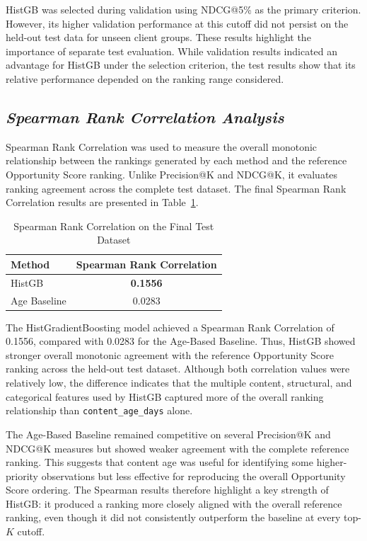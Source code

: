 \documentclass[12pt,a4paper]{report}
\begin{document}
HistGB was selected during validation using NDCG@5\% as the primary criterion. However, its higher validation performance at this cutoff did not persist on the held-out test data for unseen client groups. These results highlight the importance of separate test evaluation. While validation results indicated an advantage for HistGB under the selection criterion, the test results show that its relative performance depended on the ranking range considered.

\subsection{\textit{Spearman Rank Correlation Analysis}}

Spearman Rank Correlation was used to measure the overall monotonic relationship between the rankings generated by each method and the reference Opportunity Score ranking. Unlike Precision@K and NDCG@K, it evaluates ranking agreement across the complete test dataset. The final Spearman Rank Correlation results are presented in Table~\ref{tab:spearman_results}.

\begin{table}[htbp]
\centering
\caption{Spearman Rank Correlation on the Final Test Dataset}
\label{tab:spearman_results}
\begin{tabular}{|l|c|}
\hline
\textbf{Method} & \textbf{Spearman Rank Correlation} \\
\hline
HistGB & \textbf{0.1556} \\
\hline
Age Baseline & 0.0283 \\
\hline
\end{tabular}
\end{table}

The HistGradientBoosting model achieved a Spearman Rank Correlation of 0.1556, compared with 0.0283 for the Age-Based Baseline. Thus, HistGB showed stronger overall monotonic agreement with the reference Opportunity Score ranking across the held-out test dataset. Although both correlation values were relatively low, the difference indicates that the multiple content, structural, and categorical features used by HistGB captured more of the overall ranking relationship than \texttt{content\_age\_days} alone.

The Age-Based Baseline remained competitive on several Precision@K and NDCG@K measures but showed weaker agreement with the complete reference ranking. This suggests that content age was useful for identifying some higher-priority observations but less effective for reproducing the overall Opportunity Score ordering. The Spearman results therefore highlight a key strength of HistGB: it produced a ranking more closely aligned with the overall reference ranking, even though it did not consistently outperform the baseline at every top-$K$ cutoff.
\end{document}
